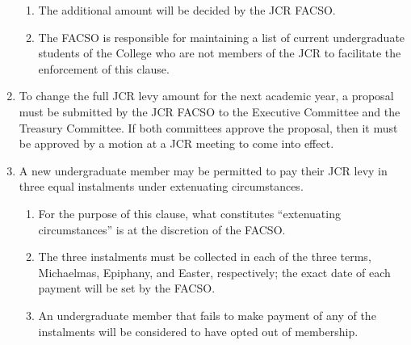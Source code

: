 \documentclass[12pt]{article}
\begin{document}
\begin{enumerate}
    \begin{enumerate}
        \item The additional amount will be decided by the JCR FACSO.
        \item The FACSO is responsible for maintaining a list of current undergraduate students of the College who are not members of the JCR to facilitate the enforcement of this clause.
    \end{enumerate}
    \item To change the full JCR levy amount for the next academic year, a proposal must be submitted by the JCR FACSO to the Executive Committee and the Treasury Committee. If both committees approve the proposal, then it must be approved by a motion at a JCR meeting to come into effect.
    \item A new undergraduate member may be permitted to pay their JCR levy in three equal instalments under extenuating circumstances.
    \begin{enumerate}
        \item For the purpose of this clause, what constitutes ``extenuating circumstances'' is at the discretion of the FACSO.
        \item The three instalments must be collected in each of the three terms, Michaelmas, Epiphany, and Easter, respectively; the exact date of each payment will be set by the FACSO.
        \item An undergraduate member that fails to make payment of any of the instalments will be considered to have opted out of membership.
    \end{enumerate}

\end{enumerate}
\end{document}

